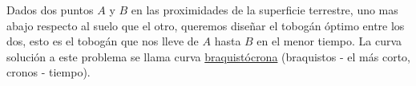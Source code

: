 \begin{problema} Dados dos puntos $A$ y $B$ en las proximidades de la superficie terrestre, uno mas abajo respecto al suelo que el otro,
queremos diseñar el tobogán óptimo entre los dos,
esto es el tobogán que nos lleve de $A$ hasta $B$ en el menor tiempo. La curva solución a este problema se llama curva 
\href{http://es.wikipedia.org/wiki/Curva_braquistócrona}{braquistócrona} (braquistos - el más corto, cronos - tiempo).
\end{problema}\vspace{-1cm}\link
%
%
%


\begin{center}
\end{center}


